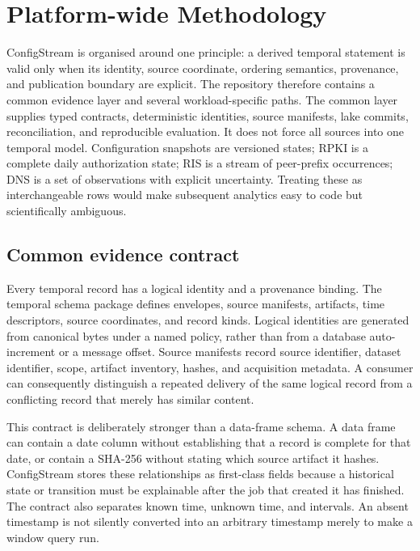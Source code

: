 \section{Platform-wide Methodology}
\label{sec:platform-method}

ConfigStream is organised around one principle: a derived temporal statement is valid only when its identity, source coordinate, ordering semantics, provenance, and publication boundary are explicit. The repository therefore contains a common evidence layer and several workload-specific paths. The common layer supplies typed contracts, deterministic identities, source manifests, lake commits, reconciliation, and reproducible evaluation. It does not force all sources into one temporal model. Configuration snapshots are versioned states; RPKI is a complete daily authorization state; RIS is a stream of peer-prefix occurrences; DNS is a set of observations with explicit uncertainty. Treating these as interchangeable rows would make subsequent analytics easy to code but scientifically ambiguous.

\subsection{Common evidence contract}

Every temporal record has a logical identity and a provenance binding. The temporal schema package defines envelopes, source manifests, artifacts, time descriptors, source coordinates, and record kinds. Logical identities are generated from canonical bytes under a named policy, rather than from a database auto-increment or a message offset. Source manifests record source identifier, dataset identifier, scope, artifact inventory, hashes, and acquisition metadata. A consumer can consequently distinguish a repeated delivery of the same logical record from a conflicting record that merely has similar content.

This contract is deliberately stronger than a data-frame schema. A data frame can contain a date column without establishing that a record is complete for that date, or contain a SHA-256 without stating which source artifact it hashes. ConfigStream stores these relationships as first-class fields because a historical state or transition must be explainable after the job that created it has finished. The contract also separates known time, unknown time, and intervals. An absent timestamp is not silently converted into an arbitrary timestamp merely to make a window query run.


